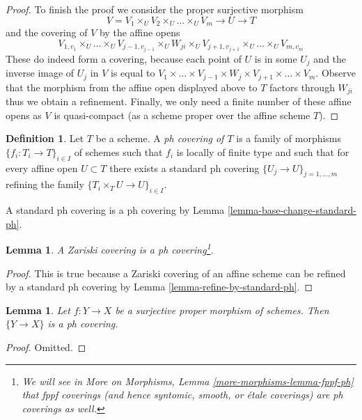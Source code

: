 \documentclass{stacks-project}
\theoremstyle{plain}
\newtheorem{lemma}[subsection]{Lemma}
\theoremstyle{definition}
\newtheorem{definition}[subsection]{Definition}
\theoremstyle{remark}
\numberwithin{equation}{subsection}
\begin{document}
\begin{proof}
\medskip\noindent
To finish the proof we consider the proper surjective morphism
$$
V = V_1 \times_U V_2 \times_U \ldots \times_U V_m
\longrightarrow U \longrightarrow T
$$
and the covering of $V$ by the affine opens
$$
V_{1, v_1} \times_U \ldots \times_U V_{j - 1, v_{j - 1}}
\times_U W_{j i} \times_U
V_{j + 1, v_{j + 1}} \times_U \ldots \times_U V_{m, v_m}
$$
These do indeed form a covering, because each point of $U$ is
in some $U_j$ and the inverse image of $U_j$ in $V$ is equal to
$V_1 \times \ldots \times V_{j - 1} \times W_j \times V_{j + 1} \times
\ldots \times V_m$. Observe that the morphism from
the affine open displayed above to $T$ factors through $W_{ji}$
thus we obtain a refinement. Finally, we only need a finite number
of these affine opens as $V$ is quasi-compact (as a scheme proper
over the affine scheme $T$).
\end{proof}

\begin{definition}
\label{definition-ph-covering}
Let $T$ be a scheme. A {\it ph covering of $T$} is a family
of morphisms $\{f_i : T_i \to T\}_{i \in I}$ of schemes such
that $f_i$ is locally of finite type and such that for every
affine open $U \subset T$ there exists a standard ph covering
$\{U_j \to U\}_{j = 1, \ldots, m}$ refining the family
$\{T_i \times_T U \to U\}_{i \in I}$.
\end{definition}

\noindent
A standard ph covering is a ph covering by
Lemma \ref{lemma-base-change-standard-ph}.

\begin{lemma}
\label{lemma-zariski-ph}
A Zariski covering is a ph covering\footnote{We will see
in More on Morphisms, Lemma \ref{more-morphisms-lemma-fppf-ph} that
fppf coverings (and hence syntomic, smooth, or \'etale coverings)
are ph coverings as well.}.
\end{lemma}

\begin{proof}
This is true because a Zariski covering of an affine scheme
can be refined by a standard ph covering by
Lemma \ref{lemma-refine-by-standard-ph}.
\end{proof}

\begin{lemma}
\label{lemma-surjective-proper-ph}
Let $f : Y \to X$ be a surjective proper morphism of schemes.
Then $\{Y \to X\}$ is a ph covering.
\end{lemma}

\begin{proof}
Omitted.
\end{proof}
\end{document}
